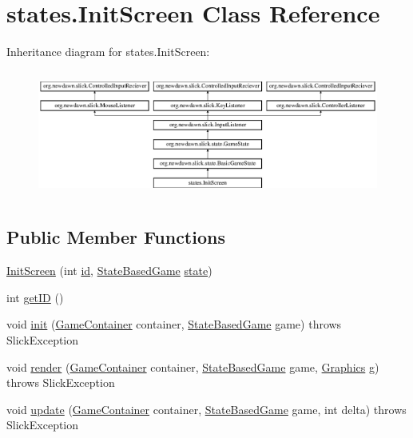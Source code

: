 \hypertarget{classstates_1_1_init_screen}{}\section{states.\+Init\+Screen Class Reference}
\label{classstates_1_1_init_screen}
Inheritance diagram for states.\+Init\+Screen\+:\begin{figure}[H]
\begin{center}
\leavevmode
\includegraphics[height=4.226415cm]{classstates_1_1_init_screen}
\end{center}
\end{figure}
\subsection*{Public Member Functions}
\begin{DoxyCompactItemize}
\item 
\mbox{\hyperlink{classstates_1_1_init_screen_a2dd28d80f8ad3aa9fe7b3199a9a8ad32}{Init\+Screen}} (int \mbox{\hyperlink{classstates_1_1_init_screen_a87ad48b02237b484fef3e4f22393eec9}{id}}, \mbox{\hyperlink{classorg_1_1newdawn_1_1slick_1_1state_1_1_state_based_game}{State\+Based\+Game}} \mbox{\hyperlink{classstates_1_1_init_screen_a18c729614a5791801410d22943a7c36f}{state}})
\item 
int \mbox{\hyperlink{classstates_1_1_init_screen_a7ca8734976ee39db7bd5c72d63e7a9b9}{get\+ID}} ()
\item 
void \mbox{\hyperlink{classstates_1_1_init_screen_aaf434e33dbe6466006ef3693e1140c7c}{init}} (\mbox{\hyperlink{classorg_1_1newdawn_1_1slick_1_1_game_container}{Game\+Container}} container, \mbox{\hyperlink{classorg_1_1newdawn_1_1slick_1_1state_1_1_state_based_game}{State\+Based\+Game}} game)  throws Slick\+Exception 
\item 
void \mbox{\hyperlink{classstates_1_1_init_screen_ae9974ec1ac8cad862a037775f8250e75}{render}} (\mbox{\hyperlink{classorg_1_1newdawn_1_1slick_1_1_game_container}{Game\+Container}} container, \mbox{\hyperlink{classorg_1_1newdawn_1_1slick_1_1state_1_1_state_based_game}{State\+Based\+Game}} game, \mbox{\hyperlink{classorg_1_1newdawn_1_1slick_1_1_graphics}{Graphics}} g)  throws Slick\+Exception 
\item 
void \mbox{\hyperlink{classstates_1_1_init_screen_a1da0633b981bad92a90d5f72e56561bd}{update}} (\mbox{\hyperlink{classorg_1_1newdawn_1_1slick_1_1_game_container}{Game\+Container}} container, \mbox{\hyperlink{classorg_1_1newdawn_1_1slick_1_1state_1_1_state_based_game}{State\+Based\+Game}} game, int delta)  throws Slick\+Exception 
\end{DoxyCompactItemize}
